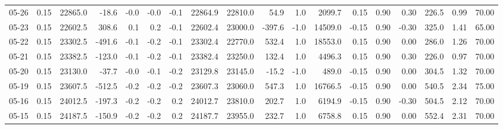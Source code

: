 \begin{threeparttable}
{\begin{tabular}{lrrrrrrrrrrrrrrrrr}
  05-26 &     0.15 & 22865.0 &             -18.6 &              -0.0 &               -0.0 &               -0.1 & 22864.9 & 22810.0 &       54.9 &                      1.0 &              2099.7 &       0.15 &      0.90 &           0.30 &            226.5 &            0.99 &                  70.00 \\
  05-23 &     0.15 & 22602.5 &             308.6 &               0.1 &                0.2 &               -0.1 & 22602.4 & 23000.0 &     -397.6 &                     -1.0 &             14509.0 &      -0.15 &      0.90 &          -0.30 &            325.0 &            1.41 &                  65.00 \\
  05-22 &     0.15 & 23302.5 &            -491.6 &              -0.1 &               -0.2 &               -0.1 & 23302.4 & 22770.0 &      532.4 &                      1.0 &             18553.0 &       0.15 &      0.90 &           0.00 &            286.0 &            1.26 &                  70.00 \\
  05-21 &     0.15 & 23382.5 &            -123.0 &              -0.1 &               -0.2 &               -0.1 & 23382.4 & 23250.0 &      132.4 &                      1.0 &              4496.3 &       0.15 &      0.90 &           0.30 &            226.0 &            0.97 &                  70.00 \\
  05-20 &     0.15 & 23130.0 &             -37.7 &              -0.0 &               -0.1 &               -0.2 & 23129.8 & 23145.0 &      -15.2 &                     -1.0 &               489.0 &      -0.15 &      0.90 &           0.00 &            304.5 &            1.32 &                  70.00 \\
  05-19 &     0.15 & 23607.5 &            -512.5 &              -0.2 &               -0.2 &               -0.2 & 23607.3 & 23060.0 &      547.3 &                      1.0 &             16766.5 &      -0.15 &      0.90 &           0.00 &            540.5 &            2.34 &                  75.00 \\
  05-16 &     0.15 & 24012.5 &            -197.3 &              -0.2 &               -0.2 &                0.2 & 24012.7 & 23810.0 &      202.7 &                      1.0 &              6194.9 &      -0.15 &      0.90 &          -0.30 &            504.5 &            2.12 &                  70.00 \\
  05-15 &     0.15 & 24187.5 &            -150.9 &              -0.2 &               -0.2 &                0.2 & 24187.7 & 23955.0 &      232.7 &                      1.0 &              6758.8 &       0.15 &      0.90 &           0.00 &            552.4 &            2.31 &                  70.00 \\

\end{tabular}}
\end{threeparttable}
